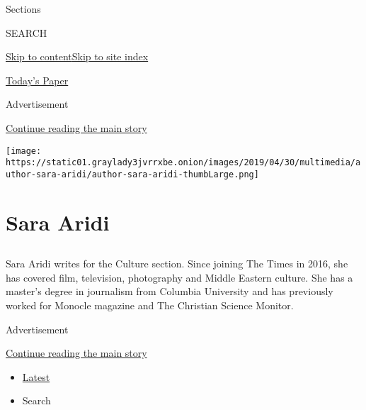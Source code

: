 Sections

SEARCH

\protect\hyperlink{site-content}{Skip to
content}\protect\hyperlink{site-index}{Skip to site index}

\href{https://myaccount.nytimes3xbfgragh.onion/auth/login?response_type=cookie\&client_id=vi}{}

\href{https://www.nytimes3xbfgragh.onion/section/todayspaper}{Today's
Paper}

Advertisement

\protect\hyperlink{after-top}{Continue reading the main story}

\texttt{[image: https://static01.graylady3jvrrxbe.onion/images/2019/04/30/multimedia/author-sara-aridi/author-sara-aridi-thumbLarge.png]}

\hypertarget{sara-aridi}{%
\section{Sara Aridi}\label{sara-aridi}}

\subsection{}

Sara Aridi writes for the Culture section. Since joining The Times in
2016, she has covered film, television, photography and Middle Eastern
culture. She has a master's degree in journalism from Columbia
University and has previously worked for Monocle magazine and The
Christian Science Monitor.

Advertisement

\protect\hyperlink{after-mid1}{Continue reading the main story}

\begin{itemize}
\tightlist
\item
  \protect\hyperlink{stream-panel}{Latest}
\item
  Search
\end{itemize}

